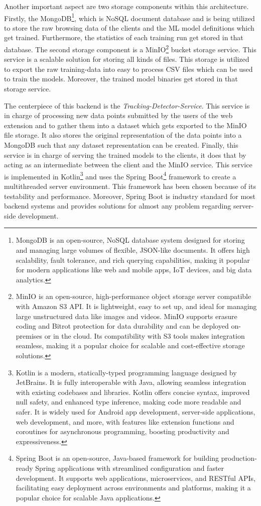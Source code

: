 Another important aspect are two storage components within this
architecture. Firstly, the MongoDB\footnote{MongoDB is an open-source, NoSQL database system designed for storing and managing large volumes of flexible, JSON-like documents. It offers high scalability, fault tolerance, and rich querying capabilities, making it popular for modern applications like web and mobile apps, IoT devices, and big data analytics.}, which is NoSQL document database and is being utilized to store the raw browsing data of the clients and the ML model definitions which get 
trained. Furthermore, the statistics of each training run get stored in that database. The second storage component is a MinIO\footnote{MinIO is an open-source, high-performance object storage server compatible with Amazon S3 API. It is lightweight, easy to set up, and ideal for managing large unstructured data like images and videos. MinIO supports erasure coding and Bitrot protection for data durability and can be deployed on-premises or in the cloud. Its compatibility with S3 tools makes integration seamless, making it a popular choice for scalable and cost-effective storage solutions.} bucket storage service. This service 
is a scalable solution for storing all kinds of files.
This storage is utilized to export the raw training-data into easy to process CSV files which can be used to train the models. Moreover, the trained model
binaries get stored in that storage service.

The centerpiece of this backend is the \emph{Tracking-Detector-Service}. This service is in charge of processing new data points 
submitted by the users of the web extension and to gather them into a dataset which gets exported to the MinIO file storage. It also stores 
the original representation of the data points into a MongoDB such that any dataset representation can be created. Finally, this service
is in charge of serving the trained models to the clients, it does that by acting as an intermediate between the client and the MinIO service.
This service is implemented in Kotlin\footnote{Kotlin is a modern, statically-typed programming language designed by JetBrains. It is fully interoperable with Java, allowing seamless integration with existing codebases and libraries. Kotlin offers concise syntax, improved null safety, and enhanced type inference, making code more readable and safer. It is widely used for Android app development, server-side applications, web development, and more, with features like extension functions and coroutines for asynchronous programming, boosting productivity and expressiveness.} and uses the Spring Boot\footnote{Spring Boot is an open-source, Java-based framework for building production-ready Spring applications with streamlined configuration and faster development. It supports web applications, microservices, and RESTful APIs, facilitating easy deployment across environments and platforms, making it a popular choice for scalable Java applications.} framework to create a multithreaded server environment.
This framework has been chosen because of its testability and performance. Moreover, Spring Boot is industry standard for most backend systems and
provides solutions for almost any problem regarding server-side development.

